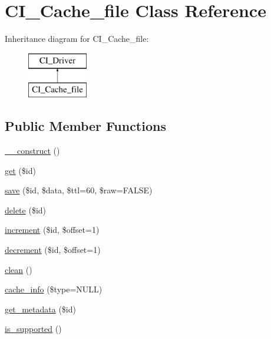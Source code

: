 \hypertarget{class_c_i___cache__file}{}\section{C\+I\+\_\+\+Cache\+\_\+file Class Reference}
\label{class_c_i___cache__file}
Inheritance diagram for C\+I\+\_\+\+Cache\+\_\+file\+:\begin{figure}[H]
\begin{center}
\leavevmode
\includegraphics[height=2.000000cm]{class_c_i___cache__file}
\end{center}
\end{figure}
\subsection*{Public Member Functions}
\begin{DoxyCompactItemize}
\item 
\mbox{\hyperlink{class_c_i___cache__file_a095c5d389db211932136b53f25f39685}{\+\_\+\+\_\+construct}} ()
\item 
\mbox{\hyperlink{class_c_i___cache__file_a50e3bfb586b2f42932a6a93f3fbb0828}{get}} (\$id)
\item 
\mbox{\hyperlink{class_c_i___cache__file_a472645db04a8ce4b040b789a3062a7d2}{save}} (\$id, \$data, \$ttl=60, \$raw=F\+A\+L\+SE)
\item 
\mbox{\hyperlink{class_c_i___cache__file_a2f8258add505482d7f00ea26493a5723}{delete}} (\$id)
\item 
\mbox{\hyperlink{class_c_i___cache__file_a2f07a4e09b57f4460d49852497d1808f}{increment}} (\$id, \$offset=1)
\item 
\mbox{\hyperlink{class_c_i___cache__file_a4eb1c2772c8efc48c411ea060dd040b7}{decrement}} (\$id, \$offset=1)
\item 
\mbox{\hyperlink{class_c_i___cache__file_adb40b812890a8bc058bf6b7a0e1a54d9}{clean}} ()
\item 
\mbox{\hyperlink{class_c_i___cache__file_aa8b9c4d9f0387156736ccd8850f0727e}{cache\+\_\+info}} (\$type=N\+U\+LL)
\item 
\mbox{\hyperlink{class_c_i___cache__file_a59635cf18e997c5141bffa05ff7622e0}{get\+\_\+metadata}} (\$id)
\item 
\mbox{\hyperlink{class_c_i___cache__file_a98c68fd153468bc148c4ed8c716859fc}{is\+\_\+supported}} ()
\end{DoxyCompactItemize}

